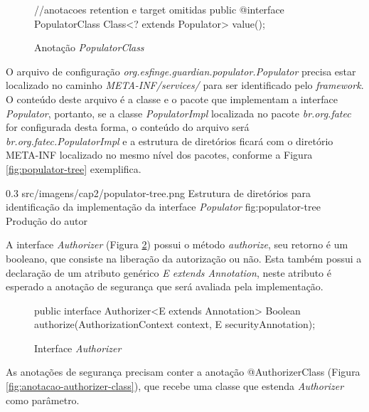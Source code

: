 \begin{figure}[H]
    \centering
    \caption{Anotação \textit{PopulatorClass}}
    \begin{java}
//anotacoes retention e target omitidas
public @interface PopulatorClass {
	Class<? extends Populator> value();
}
    \end{java}
    \label{fig:populator-class}
\end{figure}

\par O arquivo de configuração \textit{org.esfinge.guardian.populator.Populator} precisa estar localizado no caminho \textit{META-INF/services/} para ser identificado pelo \textit{framework}. O conteúdo deste arquivo é a classe e o pacote que implementam a interface \textit{Populator}, portanto, se a classe \textit{PopulatorImpl} localizada no pacote \textit{br.org.fatec} for configurada desta forma, o conteúdo do arquivo será \textit{br.org.fatec.PopulatorImpl} e a estrutura de diretórios ficará com o diretório META-INF localizado no mesmo nível dos pacotes, conforme a Figura \ref{fig:populator-tree} exemplifica.

\begin{image}
{0.3} %
{src/imagens/cap2/populator-tree.png} %
{Estrutura de diretórios para identificação da implementação da interface \textit{Populator}} %
{fig:populator-tree} %
{Produção do autor} %
\end{image}

\par A interface \textit{Authorizer} (Figura \ref{fig:interface-authorizer}) possui o método \textit{authorize}, seu retorno é um booleano, que consiste na liberação da autorização ou não. Esta também possui a declaração de um atributo genérico \textit{E extends Annotation}, neste atributo é esperado a anotação de segurança que será avaliada pela implementação. 

\begin{figure}[H]
    \centering
    \caption{Interface \textit{Authorizer}}
    \begin{java}
public interface Authorizer<E extends Annotation> {
	Boolean authorize(AuthorizationContext context, E securityAnnotation);
}
    \end{java}
    \label{fig:interface-authorizer}
\end{figure}

\par As anotações de segurança precisam conter a anotação @AuthorizerClass (Figura \ref{fig:anotacao-authorizer-class}), que recebe uma classe que estenda \textit{Authorizer} como parâmetro.

